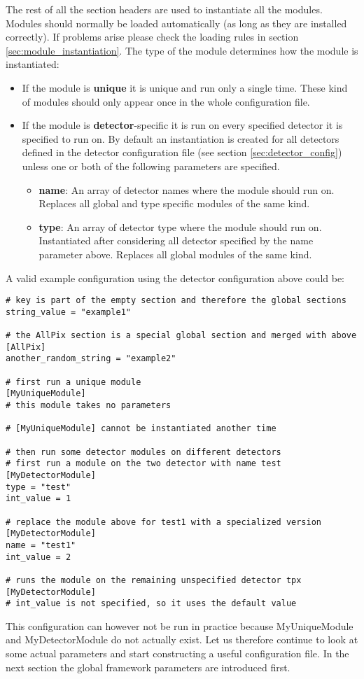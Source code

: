 The rest of all the section headers are used to instantiate all the modules. Modules should normally be loaded automatically (as long as they are installed correctly). If problems arise please check the loading rules in section \ref{sec:module_instantiation}. The type of the module determines how the module is instantiated:
\begin{itemize}
\item If the module is \textbf{unique} it is unique and run only a single time. These kind of modules should only appear once in the whole configuration file.
\item If the module is \textbf{detector}-specific it is run on every specified detector it is specified to run on. By default an instantiation is created for all detectors defined in the detector configuration file (see section \ref{sec:detector_config}) unless one or both of the following parameters are specified.
\begin{itemize}
\item \textbf{name}: An array of detector names where the module should run on. Replaces all global and type specific modules of the same kind.
\item \textbf{type}: An array of detector type where the module should run on. Instantiated after considering all detector specified by the name parameter above. Replaces all global modules of the same kind. 
\end{itemize}
\end{itemize}

A valid example configuration using the detector configuration above could be:
\begin{verbatim}
# key is part of the empty section and therefore the global sections
string_value = "example1"

# the AllPix section is a special global section and merged with above
[AllPix]
another_random_string = "example2"

# first run a unique module
[MyUniqueModule]
# this module takes no parameters

# [MyUniqueModule] cannot be instantiated another time

# then run some detector modules on different detectors 
# first run a module on the two detector with name test
[MyDetectorModule]
type = "test"
int_value = 1

# replace the module above for test1 with a specialized version 
[MyDetectorModule]
name = "test1"
int_value = 2

# runs the module on the remaining unspecified detector tpx
[MyDetectorModule]
# int_value is not specified, so it uses the default value
\end{verbatim}
This configuration can however not be run in practice because MyUniqueModule and MyDetectorModule do not actually exist. Let us therefore continue to look at some actual parameters and start constructing a useful configuration file. In the next section the global framework parameters are introduced first.

